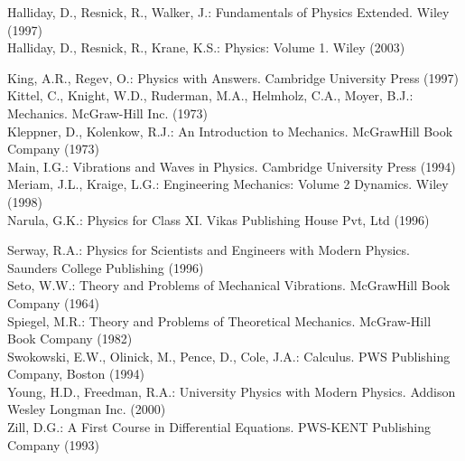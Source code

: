 \documentclass[10pt]{article}
\begin{document}
Halliday, D., Resnick, R., Walker, J.: Fundamentals of Physics Extended. Wiley (1997)\\
Halliday, D., Resnick, R., Krane, K.S.: Physics: Volume 1. Wiley (2003)

King, A.R., Regev, O.: Physics with Answers. Cambridge University Press (1997)\\
Kittel, C., Knight, W.D., Ruderman, M.A., Helmholz, C.A., Moyer, B.J.: Mechanics. McGraw-Hill Inc. (1973)\\
Kleppner, D., Kolenkow, R.J.: An Introduction to Mechanics. McGrawHill Book Company (1973)\\
Main, I.G.: Vibrations and Waves in Physics. Cambridge University Press (1994)\\
Meriam, J.L., Kraige, L.G.: Engineering Mechanics: Volume 2 Dynamics. Wiley (1998)\\
Narula, G.K.: Physics for Class XI. Vikas Publishing House Pvt, Ltd (1996)

Serway, R.A.: Physics for Scientists and Engineers with Modern Physics. Saunders College Publishing (1996)\\
Seto, W.W.: Theory and Problems of Mechanical Vibrations. McGrawHill Book Company (1964)\\
Spiegel, M.R.: Theory and Problems of Theoretical Mechanics. McGraw-Hill Book Company (1982)\\
Swokowski, E.W., Olinick, M., Pence, D., Cole, J.A.: Calculus. PWS Publishing Company, Boston (1994)\\
Young, H.D., Freedman, R.A.: University Physics with Modern Physics. Addison Wesley Longman Inc. (2000)\\
Zill, D.G.: A First Course in Differential Equations. PWS-KENT Publishing Company (1993)
\end{document}
